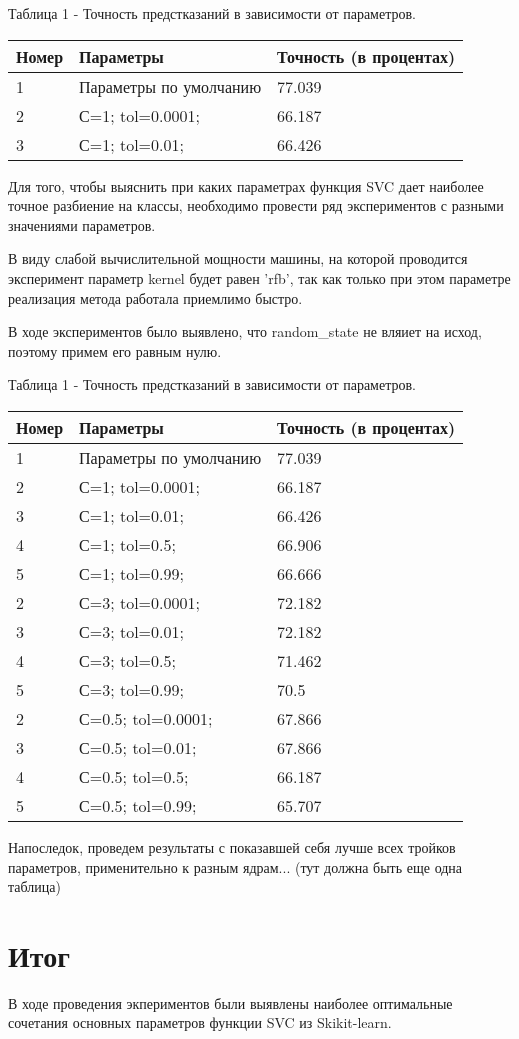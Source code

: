 \documentclass[a4paper,12pt]{article}
\begin{document}
	\vspace{0.5cm}
	Таблица 1 - Точность предстказаний в зависимости от параметров.
\begin{longtable}{|p{0.5cm}|p{10cm}|p{3cm}|}
Номер & Параметры & Точность (в процентах) \\ 
\hline 
1 & Параметры по умолчанию & 77.039 \\
\hline
2 & С=1; tol=0.0001; & 66.187 \\
\hline 
3 & С=1; tol=0.01; & 66.426 \\
\hline
\end{longtable}	
	
	Для того, чтобы выяснить при каких параметрах функция SVC дает наиболее точное разбиение на классы, необходимо провести ряд экспериментов с разными значениями параметров. 
	
	В виду слабой вычислительной мощности машины, на которой проводится эксперимент параметр  kernel будет равен 'rfb', так как только при этом параметре реализация метода работала приемлимо быстро.
	
	В ходе экспериментов было выявлено, что  random\_state не вляиет на исход, поэтому примем его равным нулю.
	
	\vspace{0.5cm}
	Таблица 1 - Точность предстказаний в зависимости от параметров.
\begin{longtable}{|p{0.5cm}|p{10cm}|p{3cm}|}
Номер & Параметры & Точность (в процентах) \\ 
\hline 
1 & Параметры по умолчанию & 77.039 \\
\hline
2 & С=1; tol=0.0001; & 66.187 \\
\hline 
3 & С=1; tol=0.01; & 66.426 \\
\hline 
4 &  С=1; tol=0.5;  & 66.906 \\
\hline 
5 & С=1; tol=0.99;  & 66.666 \\
\hline
2 & С=3; tol=0.0001; & 72.182 \\
\hline 
3 & С=3; tol=0.01; & 72.182 \\
\hline 
4 &  С=3; tol=0.5;  & 71.462 \\
\hline 
5 & С=3; tol=0.99;  & 70.5 \\
\hline
2 & С=0.5; tol=0.0001; & 67.866 \\
\hline 
3 & С=0.5; tol=0.01; & 67.866 \\
\hline 
4 & С=0.5; tol=0.5;  & 66.187 \\
\hline 
5 & С=0.5; tol=0.99;  & 65.707 \\
\hline 
\end{longtable}

	\vspace{0.5cm}
	Напоследок, проведем результаты с показавшей себя лучше всех тройков параметров, применительно к разным ядрам...
	(тут должна быть еще одна таблица)


\newpage\section{Итог}
	В ходе проведения экпериментов были выявлены наиболее оптимальные сочетания основных параметров функции SVC из Skikit-learn. 
	
	
\end{document}
